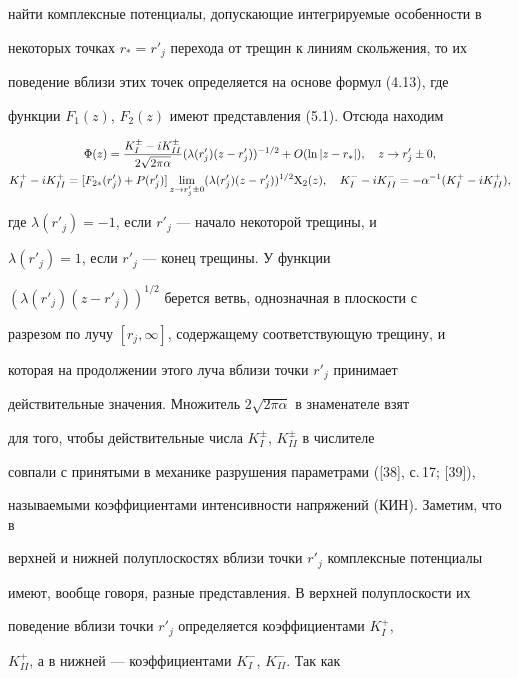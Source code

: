 найти комплексные потенциалы, допускающие интегрируемые особенности в 


некоторых точках $r_*=r'_j$ перехода от трещин к линиям скольжения, то их 


поведение вблизи этих точек определяется на основе формул (4.13), где 


функции $F_1(z)$, $F_2(z)$ имеют представления (5.1). Отсюда находим 


\begin{gather*} 


\Phi(z)=\frac{K^\pm_I-i K^\pm_{II}}{2\sqrt{2\pi\alpha}} 


(\lambda(r'_j)(z-r'_j))^{-1/2}+O(\ln|z-r_*|),\quad 


z\to r'_j\pm0,\\ 


K^+_I-i K^+_{II}=[F_{2\ast}(r'_j)+P(r'_j)]\lim_{z\to r'_j\pm0} 


(\lambda(r'_j)(z-r'_j))^{1/2}\X_2(z),\quad 


K^-_I-i K^-_{II}=-\alpha^{-1}(K^+_I-i K^+_{II}), 


\end{gather*} 


где $\lambda(r'_j)=-1$, если $r'_j$ --- начало некоторой трещины, и 


$\lambda(r'_j)=1$, если $r'_j$ --- конец трещины. У функции 


$(\lambda(r'_j)(z-r'_j))^{1/2}$ берется ветвь, однозначная в плоскости с 


разрезом по лучу $[r_j,\infty]$, содержащему соответствующую трещину, и 


которая на продолжении этого луча вблизи точки $r'_j$ принимает 


действительные значения. Множитель $2\sqrt{2\pi\alpha}$ в знаменателе взят 


для того, чтобы действительные числа $K^\pm_I$, $K^\pm_{II}$ в числителе 


совпали с принятыми в механике разрушения параметрами ([38], с.\,17; [39]), 


называемыми коэффициентами интенсивности напряжений (КИН). Заметим, что в 


верхней и нижней полуплоскостях вблизи точки $r'_j$ комплексные потенциалы 


имеют, вообще говоря, разные представления. В верхней полуплоскости их 


поведение вблизи точки $r'_j$ определяется коэффициентами $K^+_I$, 


$K^+_{II}$, а в нижней --- коэффициентами $K^-_I$, $K^-_{II}$. Так как 


